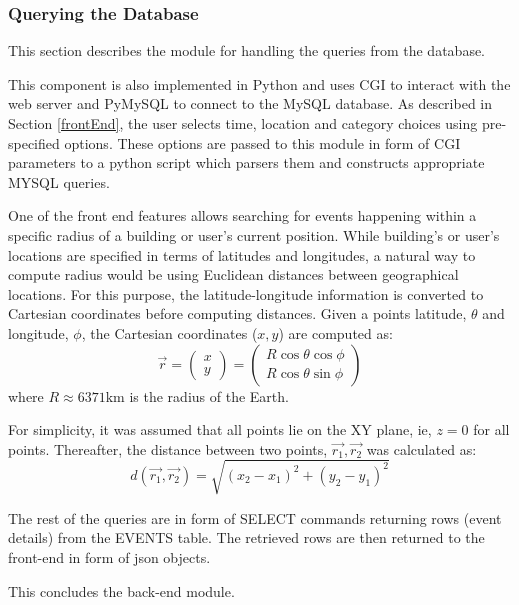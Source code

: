 \documentclass{acm_proc_article-sp}
\begin{document}
\subsubsection{Querying the Database}
This section describes the module for handling the queries from the database. 

This component is also implemented in Python and uses CGI to interact with the web server and PyMySQL to connect to the MySQL database. As described in Section \ref{frontEnd}, the user selects time, location and category choices using pre-specified options. These options are passed to this module in form of CGI parameters to a python script which parsers them and constructs appropriate MYSQL queries. 

One of the front end features allows searching for events happening within a specific radius of a building or user's current position. While building's or user's locations are specified in terms of latitudes and longitudes, a natural way to compute radius would be using Euclidean distances between geographical locations. For this purpose, the latitude-longitude information is converted to Cartesian coordinates before computing distances. Given  a points latitude, $\theta$ and longitude, $\phi$, the Cartesian coordinates ($x,y$) are computed as:\\
\begin{equation}
\vec{r}=\left(\begin{array}{c}x\\y\end{array}\right)
=
\left(\begin{array}{c}
R\cos\theta\cos\phi
\\
R\cos\theta\sin\phi
\end{array}\right)
\end{equation}
where $R\approx 6371 \mathrm{km}$ is the radius of the Earth. 

For simplicity, it was assumed that all points lie on the XY plane, ie, $z=0$ for all points. Thereafter, the distance between two points, $\vec{r_1},\vec{r_2}$ was calculated as:
\begin{equation}
d(\vec{r_1},\vec{r_2})=\sqrt{(x_2-x_1)^2+(y_2-y_1)^2}
\end{equation}

The rest of the queries are in form of SELECT commands returning rows (event details) from the EVENTS table. The retrieved rows are then returned to the front-end in form of json objects. 

This concludes the back-end module.
\end{document}
